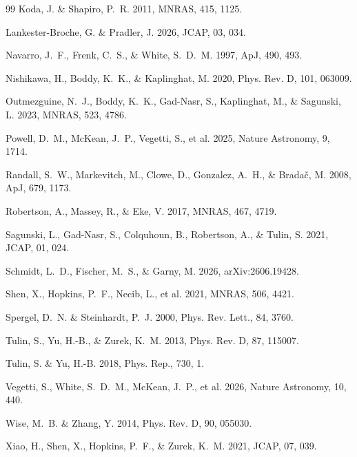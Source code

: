 \documentclass[12pt]{article}
\begin{document}
\begin{thebibliography}{99}
Koda, J. \& Shapiro, P.~R. 2011, MNRAS, 415, 1125.

Lankester-Broche, G. \& Pradler, J. 2026, JCAP, 03, 034.

Navarro, J.~F., Frenk, C.~S., \& White, S.~D.~M. 1997, ApJ, 490, 493.

Nishikawa, H., Boddy, K.~K., \& Kaplinghat, M. 2020,
Phys. Rev. D, 101, 063009.

Outmezguine, N.~J., Boddy, K.~K., Gad-Nasr, S., Kaplinghat, M., \&
Sagunski, L. 2023, MNRAS, 523, 4786.

Powell, D.~M., McKean, J.~P., Vegetti, S., et al. 2025,
Nature Astronomy, 9, 1714.

Randall, S.~W., Markevitch, M., Clowe, D., Gonzalez, A.~H., \& Brada\v{c},
M. 2008, ApJ, 679, 1173.

Robertson, A., Massey, R., \& Eke, V. 2017, MNRAS, 467, 4719.

Sagunski, L., Gad-Nasr, S., Colquhoun, B., Robertson, A., \& Tulin, S. 2021,
JCAP, 01, 024.

Schmidt, L.~D., Fischer, M.~S., \& Garny, M. 2026,
arXiv:2606.19428.

Shen, X., Hopkins, P.~F., Necib, L., et al. 2021, MNRAS, 506, 4421.

Spergel, D.~N. \& Steinhardt, P.~J. 2000, Phys. Rev. Lett., 84, 3760.

Tulin, S., Yu, H.-B., \& Zurek, K.~M. 2013, Phys. Rev. D, 87, 115007.

Tulin, S. \& Yu, H.-B. 2018, Phys. Rep., 730, 1.

Vegetti, S., White, S.~D.~M., McKean, J.~P., et al. 2026,
Nature Astronomy, 10, 440.

Wise, M.~B. \& Zhang, Y. 2014, Phys. Rev. D, 90, 055030.

Xiao, H., Shen, X., Hopkins, P.~F., \& Zurek, K.~M. 2021, JCAP, 07, 039.
\end{thebibliography}
\end{document}
